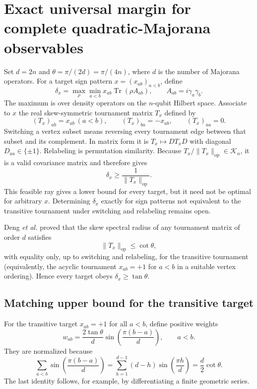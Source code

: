 \documentclass[10pt,aps,pra,twocolumn,superscriptaddress,nofootinbib,longbibliography]{revtex4-2}
\newcommand{\Tr}{\operatorname{Tr}}
\newcommand{\op}{\mathrm{op}}
\newcommand{\calK}{\mathcal{K}}
\begin{document}
{\section{Exact universal margin for complete quadratic-Majorana observables}
\label{supp:exact-margin}
Set $d=2n$ and $\theta=\pi/(2d)=\pi/(4n)$, where $d$ is the number of Majorana operators.  For a target sign pattern $x=(x_{ab})_{a<b}$, define
\begin{equation}
    \delta_x=\max_\rho\min_{a<b}x_{ab}\Tr(\rho A_{ab}),\qquad A_{ab}=i\gamma_a\gamma_b.
    \label{eq:s-deltax}
\end{equation}
The maximum is over density operators on the $n$-qubit Hilbert space.
Associate to $x$ the real skew-symmetric tournament matrix $T_x$ defined by
\begin{equation}
    (T_x)_{ab}=x_{ab}\ (a<b),\qquad (T_x)_{ba}=-x_{ab},\qquad (T_x)_{aa}=0.
    \label{eq:s-Tx}
\end{equation}
Switching a vertex subset means reversing every tournament edge between that subset and its complement.  In matrix form it is $T_x\mapsto DT_xD$ with diagonal $D_{aa}\in\{\pm1\}$.  Relabeling is permutation similarity.  Because $T_x/\|T_x\|_{\op}\in\calK_n$, it is a valid covariance matrix and therefore gives
\begin{equation}
    \delta_x\ge \frac{1}{\|T_x\|_{\op}}.
    \label{eq:s-target-lower}
\end{equation}
This feasible ray gives a lower bound for every target, but it need not be optimal for arbitrary $x$.  Determining $\delta_x$ exactly for sign patterns not equivalent to the transitive tournament under switching and relabeling remains open.

Deng \emph{et al.} proved that the skew spectral radius of any tournament matrix of order $d$ satisfies~\cite{Deng2018Tournament}
\begin{equation}
    \|T_x\|_{\op}\le\cot\theta,
    \label{eq:s-tournament}
\end{equation}
with equality only, up to switching and relabeling, for the transitive tournament (equivalently, the acyclic tournament $x_{ab}=+1$ for $a<b$ in a suitable vertex ordering).  Hence every target obeys $\delta_x\ge\tan\theta$.

\subsection{Matching upper bound for the transitive target}
For the transitive target $x_{ab}=+1$ for all $a<b$, define positive weights
\begin{equation}
    w_{ab}=\frac{2\tan\theta}{d}\sin\!\left(\frac{\pi(b-a)}{d}\right),
    \qquad a<b.
    \label{eq:s-pweights}
\end{equation}
They are normalized because
\begin{equation}
\sum_{a<b}\sin\!\left(\frac{\pi(b-a)}{d}\right)
=\sum_{h=1}^{d-1}(d-h)\sin\!\left(\frac{\pi h}{d}\right) =\frac{d}{2}\cot\theta.
\label{eq:s-sin-sum}
\end{equation}
The last identity follows, for example, by differentiating a finite geometric series.

}
\end{document}
